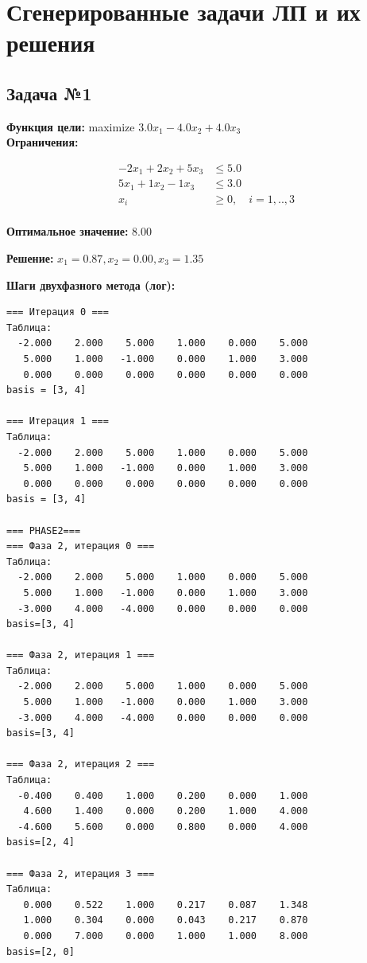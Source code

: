 \documentclass[a4paper,12pt]{article}
\begin{document}
\section*{Сгенерированные задачи ЛП и их решения}

\subsection*{Задача №1}
\textbf{Функция цели: }
maximize $ 3.0x_{1} -4.0x_{2} +4.0x_{3} $\\

\textbf{Ограничения:}

\[ \begin{aligned}
-2x_{1} +2x_{2} +5x_{3} &\le 5.0 \\
5x_{1} +1x_{2} -1x_{3} &\le 3.0 \\
x_i &\ge 0,\quad i=1,..,3\\
\end{aligned}\]

\textbf{Оптимальное значение: }$8.00$

\textbf{Решение: }$x_{1}=0.87, x_{2}=0.00, x_{3}=1.35$

\textbf{Шаги двухфазного метода (лог):}

\begin{verbatim}
=== Итерация 0 ===
Таблица:
  -2.000    2.000    5.000    1.000    0.000    5.000
   5.000    1.000   -1.000    0.000    1.000    3.000
   0.000    0.000    0.000    0.000    0.000    0.000
basis = [3, 4]

=== Итерация 1 ===
Таблица:
  -2.000    2.000    5.000    1.000    0.000    5.000
   5.000    1.000   -1.000    0.000    1.000    3.000
   0.000    0.000    0.000    0.000    0.000    0.000
basis = [3, 4]

=== PHASE2===
=== Фаза 2, итерация 0 ===
Таблица:
  -2.000    2.000    5.000    1.000    0.000    5.000
   5.000    1.000   -1.000    0.000    1.000    3.000
  -3.000    4.000   -4.000    0.000    0.000    0.000
basis=[3, 4]

=== Фаза 2, итерация 1 ===
Таблица:
  -2.000    2.000    5.000    1.000    0.000    5.000
   5.000    1.000   -1.000    0.000    1.000    3.000
  -3.000    4.000   -4.000    0.000    0.000    0.000
basis=[3, 4]

=== Фаза 2, итерация 2 ===
Таблица:
  -0.400    0.400    1.000    0.200    0.000    1.000
   4.600    1.400    0.000    0.200    1.000    4.000
  -4.600    5.600    0.000    0.800    0.000    4.000
basis=[2, 4]

=== Фаза 2, итерация 3 ===
Таблица:
   0.000    0.522    1.000    0.217    0.087    1.348
   1.000    0.304    0.000    0.043    0.217    0.870
   0.000    7.000    0.000    1.000    1.000    8.000
basis=[2, 0]

\end{verbatim}
\end{document}
